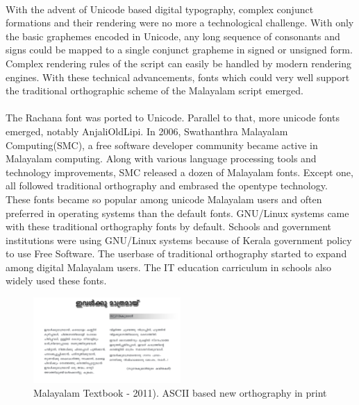 \documentclass[10pt]{article}
\begin{document}
\paragraph{}
With the advent of Unicode based digital typography, complex conjunct formations and their rendering were no more a technological challenge. With only the basic graphemes encoded in Unicode, any long sequence of consonants and signs could be mapped to a single conjunct grapheme in signed or unsigned form. Complex rendering rules of the script can easily be handled by modern rendering engines. With these technical advancements, fonts which could very well support the traditional orthographic scheme of the Malayalam script emerged. 

\paragraph{}
The Rachana font was ported to Unicode. Parallel to that, more unicode fonts emerged, notably AnjaliOldLipi. In 2006, Swathanthra Malayalam Computing(SMC), a free software developer community became active in Malayalam computing. Along with various language processing tools and technology improvements, SMC released a dozen of Malayalam fonts. Except one, all followed traditional orthography and embrased the opentype technology. These fonts became so popular among unicode Malayalam users and often preferred in operating systems than the default fonts. GNU/Linux systems came with these traditional orthography fonts by default. Schools and government institutions were using GNU/Linux systems because of Kerala government policy to use Free Software. The userbase of traditional orthography started to expand among digital Malayalam users. The IT education carriculum in schools also widely used these fonts.

\begin{figure}
	\centering
	\includegraphics[width=0.5\textwidth]{images/2011-Malayalam-Textbook.png}
	\caption{Malayalam Textbook - 2011). ASCII based new orthography in print}
	\label{textbook2011}
\end{figure}
\end{document}
